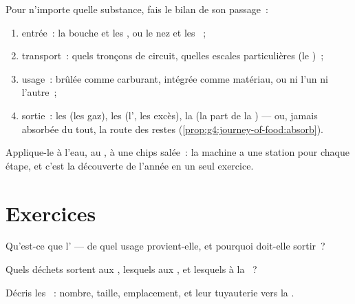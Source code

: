 \begin{method}\label{met:g7:removing-wastes:audit}
Pour n'importe quelle substance, fais le bilan de son passage~:
\begin{enumerate}
  \item entrée~: la bouche et les , ou le nez et les
        ~;
  \item transport~: quels tronçons de circuit, quelles escales
        particulières (le )~;
  \item usage~: brûlée comme carburant, intégrée comme matériau, ou
        ni l'un ni l'autre~;
  \item sortie~: les  (les gaz), les  (l', les
        excès), la  (la part de la ) --- ou, jamais
        absorbée du tout, la route des restes
        (\cref{prop:g4:journey-of-food:absorb}).
\end{enumerate}
Applique-le à l'eau, au , à une chips salée~: la machine a
une station pour chaque étape, et c'est la découverte de l'année en
un seul exercice.
\end{method}

\section{Exercices}

\begin{exercise}[$\star$]\label{exo:g7:removing-wastes:1}
Qu'est-ce que l' --- de quel usage provient-elle, et pourquoi
doit-elle sortir~?
\end{exercise}

\begin{exercise}[$\star$]\label{exo:g7:removing-wastes:2}
Quels déchets sortent aux , lesquels aux , et lesquels à
la ~?
\end{exercise}

\begin{exercise}[$\star$]\label{exo:g7:removing-wastes:3}
Décris les ~: nombre, taille, emplacement, et leur tuyauterie
vers la .
\end{exercise}

